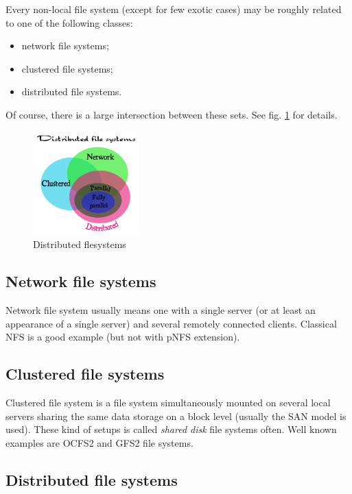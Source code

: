 \documentclass[10pt, a5paper]{article}
\begin{document}
{Every non-local file system (except for few exotic cases) may be roughly related to one of the following classes:

\begin{itemize}
  \item network file systems;
  \item clustered file systems;
  \item distributed file systems.
\end{itemize}

Of course, there is a large intersection between these sets. See fig. \ref{fig:Sav1} for details.

\begin{figure}[h]
  \centering
\includegraphics[height=4cm]{123_genesis.png}
\caption{Distributed flesystems}\label{fig:Sav1}
\end{figure}

\subsection*{Network file systems}

Network file system usually means one with a single server (or at least an appearance of a single server) and several remotely connected clients. Classical NFS\cite{bib3} is a good example (but not with pNFS\cite{bib4} extension).

\subsection*{Clustered file systems}

Clustered file system is a file system simultaneously mounted on several local servers sharing the same data storage on a block level (usually the SAN\cite{bib5} model is used). These kind of setups is called \emph{shared disk} file systems often. Well known examples are OCFS2\cite{bib6} and GFS2\cite{bib7} file systems.

\subsection*{Distributed file systems}

}
\end{document}
